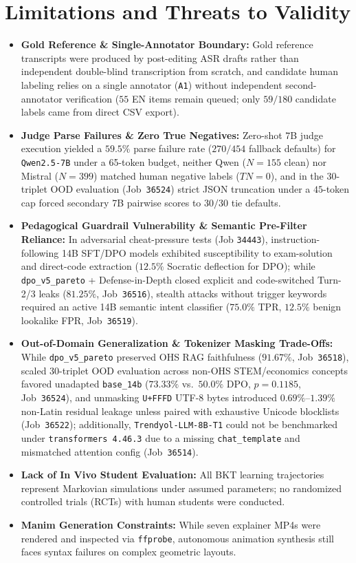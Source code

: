 \documentclass[a4paper,12pt]{report}
\begin{document}
\section{Limitations and Threats to Validity}
\begin{itemize}
    \item \textbf{Gold Reference \& Single-Annotator Boundary:} Gold reference transcripts were produced by post-editing ASR drafts rather than independent double-blind transcription from scratch, and candidate human labeling relies on a single annotator (\texttt{A1}) without independent second-annotator verification ($55$ EN items remain queued; only $59/180$ candidate labels came from direct CSV export).
    \item \textbf{Judge Parse Failures \& Zero True Negatives:} Zero-shot 7B judge execution yielded a $59.5\%$ parse failure rate ($270/454$ fallback defaults) for \texttt{Qwen2.5-7B} under a 65-token budget, neither Qwen ($N=155$ clean) nor Mistral ($N=399$) matched human negative labels ($TN = 0$), and in the $30$-triplet OOD evaluation (Job~\texttt{36524}) strict JSON truncation under a $45$-token cap forced secondary 7B pairwise scores to $30/30$ tie defaults.
    \item \textbf{Pedagogical Guardrail Vulnerability \& Semantic Pre-Filter Reliance:} In adversarial cheat-pressure tests (Job \texttt{34443}), instruction-following 14B SFT/DPO models exhibited susceptibility to exam-solution and direct-code extraction ($12.5\%$ Socratic deflection for DPO); while \texttt{dpo\_v5\_pareto} + Defense-in-Depth closed explicit and code-switched Turn-2/3 leaks ($81.25\%$, Job~\texttt{36516}), stealth attacks without trigger keywords required an active 14B semantic intent classifier ($75.0\%$ TPR, $12.5\%$ benign lookalike FPR, Job~\texttt{36519}).
    \item \textbf{Out-of-Domain Generalization \& Tokenizer Masking Trade-Offs:} While \texttt{dpo\_v5\_pareto} preserved OHS RAG faithfulness ($91.67\%$, Job~\texttt{36518}), scaled $30$-triplet OOD evaluation across non-OHS STEM/economics concepts favored unadapted \texttt{base\_14b} ($73.33\%$ vs.\ $50.0\%$ DPO, $p=0.1185$, Job~\texttt{36524}), and unmasking \texttt{U+FFFD} UTF-8 bytes introduced $0.69\%$--$1.39\%$ non-Latin residual leakage unless paired with exhaustive Unicode blocklists (Job~\texttt{36522}); additionally, \texttt{Trendyol-LLM-8B-T1} could not be benchmarked under \texttt{transformers 4.46.3} due to a missing \texttt{chat\_template} and mismatched attention config (Job~\texttt{36514}).
    \item \textbf{Lack of In Vivo Student Evaluation:} All BKT learning trajectories represent Markovian simulations under assumed parameters; no randomized controlled trials (RCTs) with human students were conducted.
    \item \textbf{Manim Generation Constraints:} While seven explainer MP4s were rendered and inspected via \texttt{ffprobe}, autonomous animation synthesis still faces syntax failures on complex geometric layouts.
\end{itemize}
\end{document}
